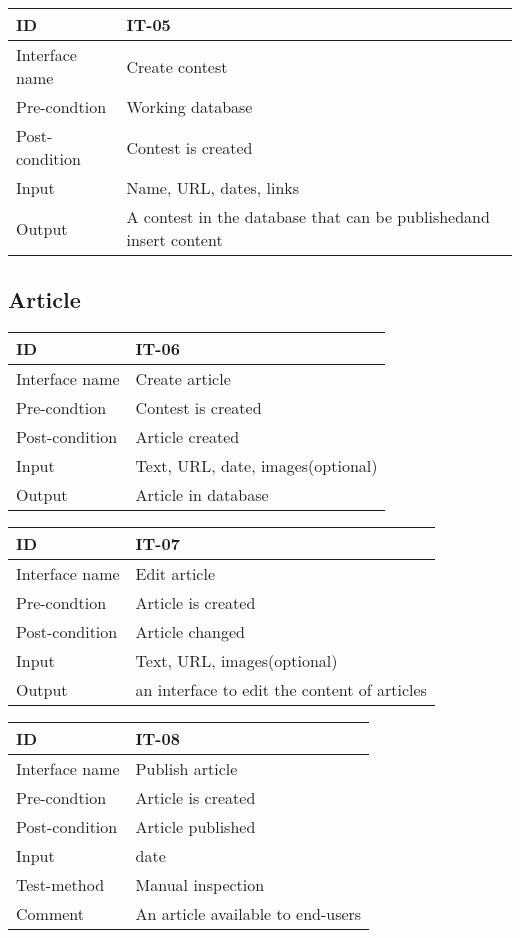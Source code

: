 \begin{longtable}{|l|p{}|}
\hline
ID & IT-05\\\hline
Interface name & Create contest\\\hline
Pre-condtion & Working database\\\hline
Post-condition & Contest is created\\\hline
Input & Name, URL, dates, links\\\hline
Output & A contest in the database that can be publishedand insert
content\\\hline
\end{longtable}


\subsection{Article}


\begin{longtable}{|l|p{}|}
\hline
ID & IT-06\\\hline
Interface name & Create article\\\hline
Pre-condtion & Contest is created\\\hline
Post-condition & Article created\\\hline
Input & Text, URL, date, images(optional)\\\hline
Output & Article in database\\\hline
\end{longtable}


\begin{longtable}{|l|p{}|}
\hline
ID & IT-07\\\hline
Interface name & Edit article\\\hline
Pre-condtion & Article is created\\\hline
Post-condition & Article changed\\\hline
Input & Text, URL, images(optional)\\\hline
Output & an interface to edit the content of
articles\\\hline
\end{longtable}


\begin{longtable}{|l|p{}|}
\hline
ID & IT-08\\\hline
Interface name & Publish article\\\hline
Pre-condtion & Article is created\\\hline
Post-condition & Article published\\\hline
Input & date\\\hline
Test-method & Manual inspection\\\hline
Comment & An article available to end-users\\\hline
\end{longtable}

